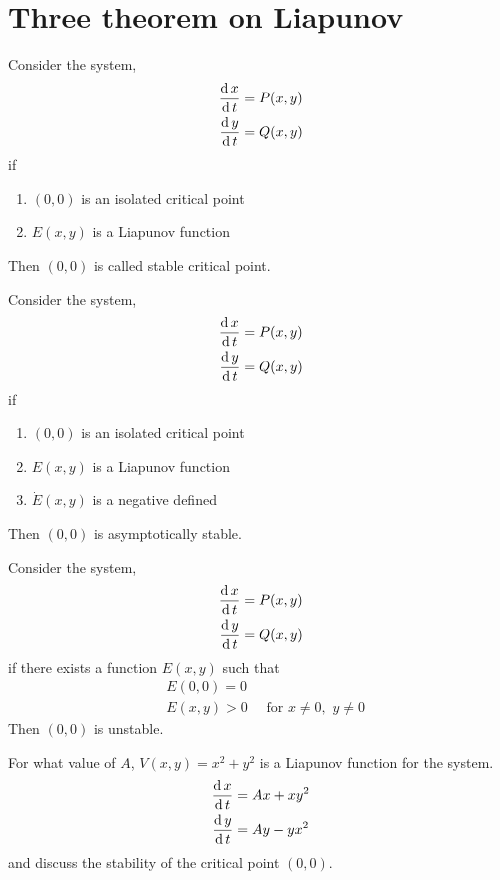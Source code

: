\documentclass[../main-sheet.tex]{subfiles}
\begin{document}
\section{Three theorem on Liapunov}
\begin{thm}
    Consider the system,
    \begin{align*}
        \,\frac{\mathrm{d}\,x}{\mathrm{d}\,t}&=P(x,y)\\
        \,\frac{\mathrm{d}\,y}{\mathrm{d}\,t}&=Q(x,y)
    \end{align*}
    if
    \begin{enumerate}[label=(\roman*)]
        \item \((0,0)\) is an isolated critical point
        \item \(E(x,y)\) is a Liapunov function
    \end{enumerate}
    Then \((0,0)\) is called stable critical point.
\end{thm}
\begin{thm}
    Consider the system,
    \begin{align*}
        \,\frac{\mathrm{d}\,x}{\mathrm{d}\,t}&=P(x,y)\\
        \,\frac{\mathrm{d}\,y}{\mathrm{d}\,t}&=Q(x,y)
    \end{align*}
    if
    \begin{enumerate}[label=(\roman*)]
        \item \((0,0)\) is an isolated critical point
        \item \(E(x,y)\) is a Liapunov function
        \item \(\dot{E}(x,y)\) is a negative defined
    \end{enumerate}
    Then \((0,0)\) is asymptotically stable.
\end{thm}
\begin{thm}
    Consider the system,
    \begin{align*}
        \,\frac{\mathrm{d}\,x}{\mathrm{d}\,t}&=P(x,y)\\
        \,\frac{\mathrm{d}\,y}{\mathrm{d}\,t}&=Q(x,y)
    \end{align*}
    if there exists a function \(E(x,y)\) such that
    \begin{align*}
        &E(0,0)=0\\
        &E(x,y)>0\quad \text{ for } x\neq 0,\,\,y\neq0
    \end{align*}
    Then \((0,0)\) is unstable.
\end{thm}
\begin{prob}
    For what value of \(A\), \(V(x,y)=x^2+y^2\) is a Liapunov function for the system.
    \begin{align*}
        \,\frac{\mathrm{d}\,x}{\mathrm{d}\,t}&=Ax+xy^2\\
        \,\frac{\mathrm{d}\,y}{\mathrm{d}\,t}&=Ay-yx^2
    \end{align*}
    and discuss the stability of the critical point \((0,0)\).
\end{prob}
\end{document}
